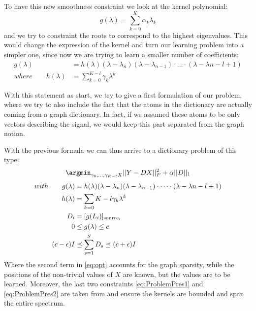 To have this new smoothness constraint we look at the kernel polynomial:
\begin{equation}
g(\lambda) = \sum_{k=0}^{K}\alpha_k \lambda_k
\end{equation}
and we try to constraint the roots to correspond to the highest eigenvalues. This would change the expression of the kernel and turn our learning problem into a simpler one, since now we are trying to learn a smaller number of coefficients:
\begin{align}
g(\lambda) &= h(\lambda)(\lambda - \lambda_n)(\lambda - \lambda_{n-1})\cdot \dots \cdot (\lambda - \lambda{n-l+1})\\
where \qquad h(\lambda) &= \sum_{k=0}^{K-l}\gamma_k\lambda^{k}
\label{eq:polynom}
\end{align}

With this statement as start, we try to give a first formulation of our problem, where we try to also include the fact that the atoms in the dictionary are actually coming from a graph dictionary. In fact, if we assumed these atoms to be only vectors describing the signal, we would keep this part separated from the graph notion.

With the previous formula we can thus arrive to a dictionary problem of this type:
\begin{equation}
\argmin_{\gamma_0,\dots,\gamma_{K-l}X} ||Y - DX||^2_F + \alpha||D||_1
\label{eq:opt}
\end{equation}
\begin{align}
with \qquad g(\lambda) &= h(\lambda)(\lambda - \lambda_n)(\lambda - \lambda_{n-1})\cdot \dots \cdot (\lambda - \lambda{n-l+1}) \notag\\
h(\lambda) &= \sum_{k=0}{K-l}\gamma_k\lambda^{k} \notag\\
D_i &= [g(L_i)]_{\text{source}_i} \notag\\
0 &\leq g(\lambda) \leq c \label{eq:ProblemPres1}\\
(c-\epsilon)I &\preceq \sum_{s=1}^{S}D_s \preceq (c+\epsilon)I \label{eq:ProblemPres2}
\end{align}
Where the second term in \autoref{eq:opt} accounts for the graph sparsity, while the positions of the non-trivial values of $X$ are known, but the values are to be learned. Moreover, the last two constraints \ref{eq:ProblemPres1} and \ref{eq:ProblemPres2} are taken from \cite{Thanou2014} and ensure the kernels are bounded and span the entire spectrum.
\label{sec:DictionaryLearningSection}

